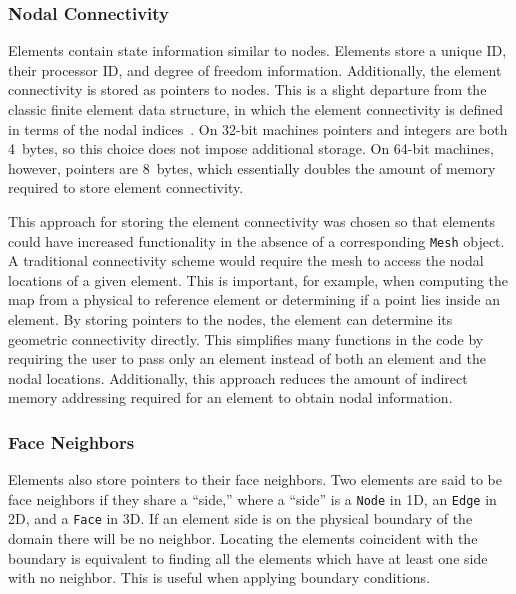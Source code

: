 \documentclass[global,twocolumn,final]{svjour}
\begin{document}
\subsubsection{Nodal Connectivity\label{sec:elements_connectivity}}
Elements contain state information similar to nodes.  Elements store a
unique ID, their processor ID, and degree of freedom information.
Additionally, the element connectivity is stored as pointers to nodes.
This is a slight departure from the classic finite element data
structure, in which the element connectivity is defined in terms of
the nodal indices~\cite{becker_carey_oden_volume_1}.  On 32-bit
machines pointers and integers are both 4~bytes, so this choice does
not impose additional storage.  On 64-bit machines, however, pointers
are 8~bytes, which essentially doubles the amount of memory required
to store element connectivity.

This approach for storing the element connectivity was chosen so that
elements could have increased functionality in the absence of a
corresponding \texttt{Mesh} object.  A traditional connectivity scheme
would require the mesh to access the nodal locations of a given
element.  This is important, for example, when computing the map from
a physical to reference element or determining if a point lies inside
an element.  By storing pointers to the nodes, the element can
determine its geometric connectivity directly.  This simplifies many
functions in the code by requiring the user to pass only an element
instead of both an element and the nodal locations.  Additionally,
this approach reduces the amount of indirect memory addressing
required for an element to obtain nodal information.

\subsubsection{Face Neighbors\label{sec:elements_neighbors}}
Elements also store pointers to their face neighbors.  Two elements
are said to be face neighbors if they share a ``side,'' where a
``side'' is a \texttt{Node} in 1D, an \texttt{Edge} in 2D, and a
\texttt{Face} in 3D.  If an element side is on the physical boundary
of the domain there will be no neighbor.
Locating the elements coincident with the boundary is equivalent
to finding all the elements which have at least one side with no
neighbor. This is useful when applying boundary conditions.
\end{document}
